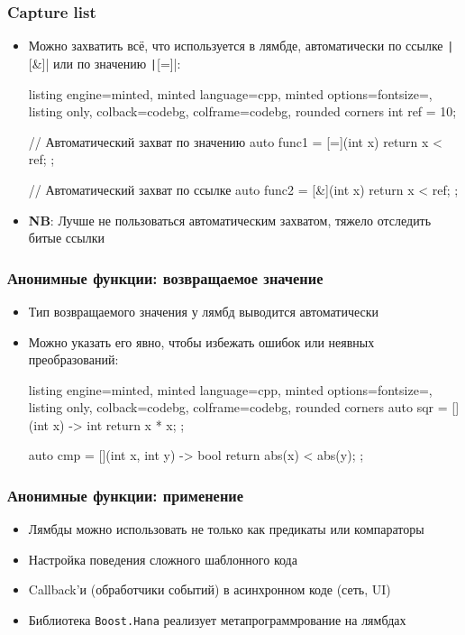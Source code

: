 \documentclass[10pt]{beamer}
\begin{document}
\begin{frame}[fragile]
\frametitle{Capture list}
\begin{itemize}
\item Можно захватить всё, что используется в лямбде, автоматически по ссылке \texttt|[&]| или по значению \texttt|[=]|:
\begin{tcblisting}{listing engine=minted, minted language=cpp, minted options={fontsize=\scriptsize}, listing only, colback=codebg, colframe=codebg, rounded corners}
int ref = 10;

// Автоматический захват по значению
auto func1 = [=](int x){ return x < ref; };

// Автоматический захват по ссылке
auto func2 = [&](int x){ return x < ref; };
\end{tcblisting}
\pause
\item \textbf{NB}: Лучше не пользоваться автоматическим захватом, тяжело отследить битые ссылки
\end{itemize}
\end{frame}

\begin{frame}[fragile]
\frametitle{Анонимные функции: возвращаемое значение}
\begin{itemize}
\item Тип возвращаемого значения у лямбд выводится автоматически
\pause
\item Можно указать его явно, чтобы избежать ошибок или неявных преобразований:
\begin{tcblisting}{listing engine=minted, minted language=cpp, minted options={fontsize=\scriptsize}, listing only, colback=codebg, colframe=codebg, rounded corners}
auto sqr = [](int x) -> int {
  return x * x;
};

auto cmp = [](int x, int y) -> bool {
  return abs(x) < abs(y);
};
\end{tcblisting}
\end{itemize}
\end{frame}

\begin{frame}[fragile]
\frametitle{Анонимные функции: применение}
\begin{itemize}
\item Лямбды можно использовать не только как предикаты или компараторы
\pause
\item Настройка поведения сложного шаблонного кода
\pause
\item Callback'и (обработчики событий) в асинхронном коде (сеть, UI)
\pause
\item Библиотека \nolinkurl{Boost.Hana} реализует метапрограммрование на лямбдах
\end{itemize}
\end{frame}
\end{document}

